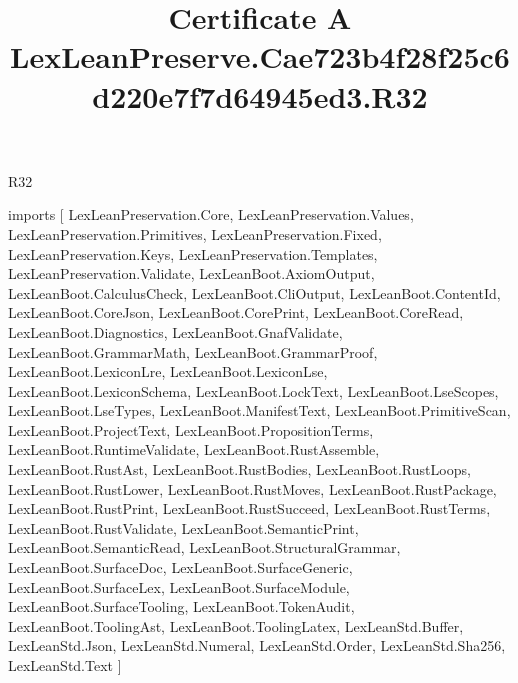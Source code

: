 \begin{lexlean}{R32}
\title{Certificate A LexLeanPreserve.Cae723b4f28f25c6d220e7f7d64945ed3.R32}
\begin{coremodule}
imports [
  LexLeanPreservation.Core,
  LexLeanPreservation.Values,
  LexLeanPreservation.Primitives,
  LexLeanPreservation.Fixed,
  LexLeanPreservation.Keys,
  LexLeanPreservation.Templates,
  LexLeanPreservation.Validate,
  LexLeanBoot.AxiomOutput,
  LexLeanBoot.CalculusCheck,
  LexLeanBoot.CliOutput,
  LexLeanBoot.ContentId,
  LexLeanBoot.CoreJson,
  LexLeanBoot.CorePrint,
  LexLeanBoot.CoreRead,
  LexLeanBoot.Diagnostics,
  LexLeanBoot.GnafValidate,
  LexLeanBoot.GrammarMath,
  LexLeanBoot.GrammarProof,
  LexLeanBoot.LexiconLre,
  LexLeanBoot.LexiconLse,
  LexLeanBoot.LexiconSchema,
  LexLeanBoot.LockText,
  LexLeanBoot.LseScopes,
  LexLeanBoot.LseTypes,
  LexLeanBoot.ManifestText,
  LexLeanBoot.PrimitiveScan,
  LexLeanBoot.ProjectText,
  LexLeanBoot.PropositionTerms,
  LexLeanBoot.RuntimeValidate,
  LexLeanBoot.RustAssemble,
  LexLeanBoot.RustAst,
  LexLeanBoot.RustBodies,
  LexLeanBoot.RustLoops,
  LexLeanBoot.RustLower,
  LexLeanBoot.RustMoves,
  LexLeanBoot.RustPackage,
  LexLeanBoot.RustPrint,
  LexLeanBoot.RustSucceed,
  LexLeanBoot.RustTerms,
  LexLeanBoot.RustValidate,
  LexLeanBoot.SemanticPrint,
  LexLeanBoot.SemanticRead,
  LexLeanBoot.StructuralGrammar,
  LexLeanBoot.SurfaceDoc,
  LexLeanBoot.SurfaceGeneric,
  LexLeanBoot.SurfaceLex,
  LexLeanBoot.SurfaceModule,
  LexLeanBoot.SurfaceTooling,
  LexLeanBoot.TokenAudit,
  LexLeanBoot.ToolingAst,
  LexLeanBoot.ToolingLatex,
  LexLeanStd.Buffer,
  LexLeanStd.Json,
  LexLeanStd.Numeral,
  LexLeanStd.Order,
  LexLeanStd.Sha256,
  LexLeanStd.Text
]


\end{coremodule}
\end{lexlean}
